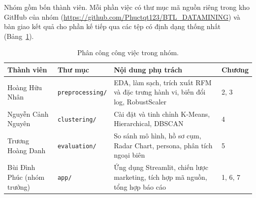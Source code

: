 \documentclass[../report.tex]{subfiles}
\begin{document}
Nhóm gồm bốn thành viên. Mỗi phần việc có thư mục mã nguồn riêng trong kho GitHub của nhóm (\url{https://github.com/Phuctqt123/BTL_DATAMINING}) và bàn giao kết quả cho phần kế tiếp qua các tệp có định dạng thống nhất (Bảng~\ref{tab:phancong}).

\begin{table}[H]
\centering
\small
\begin{tabularx}{\textwidth}{@{}l l X l@{}}
\toprule
\textbf{Thành viên} & \textbf{Thư mục} & \textbf{Nội dung phụ trách} & \textbf{Chương} \\
\midrule
Hoàng Hữu Nhân & \texttt{preprocessing/} & EDA, làm sạch, trích xuất RFM và đặc trưng hành vi, biến đổi log, RobustScaler & 2, 3 \\
Nguyễn Cảnh Nguyên & \texttt{clustering/} & Cài đặt và tinh chỉnh K-Means, Hierarchical, DBSCAN & 4 \\
Trương Hoàng Danh & \texttt{evaluation/} & So sánh mô hình, hồ sơ cụm, Radar Chart, persona, phân tích ngoại biên & 5 \\
Bùi Đình Phúc (nhóm trưởng) & \texttt{app/} & Ứng dụng Streamlit, chiến lược marketing, tích hợp mã nguồn, tổng hợp báo cáo & 1, 6, 7 \\
\bottomrule
\end{tabularx}
\caption{Phân công công việc trong nhóm.}
\label{tab:phancong}
\end{table}
\end{document}
